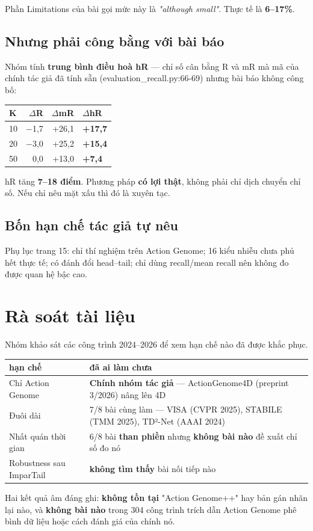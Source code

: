 \documentclass[11pt,a4paper]{article}
\newcommand{\code}[1]{{\ttfamily\small\color{codetext}#1}}
\begin{document}
Phần Limitations của bài gọi mức này là \emph{"although small"}. Thực tế là \textbf{6--17\%}.

\subsection{Nhưng phải công bằng với bài báo}
Nhóm tính \textbf{trung bình điều hoà hR} --- chỉ số cân bằng R và mR mà mã của chính tác giả đã tính sẵn (\code{evaluation\_recall.py:66-69}) nhưng bài báo không công bố:

\begin{center}\small
\begin{tabular}{@{}lrrl@{}}
\toprule
\textbf{K} & \textbf{$\Delta$R} & \textbf{$\Delta$mR} & \textbf{\textbf{$\Delta$hR}}\\
\midrule
10 & −1,7 & +26,1 & \textbf{+17,7}\\
20 & −3,0 & +25,2 & \textbf{+15,4}\\
50 & 0,0 & +13,0 & \textbf{+7,4}\\
\bottomrule
\end{tabular}
\end{center}
hR tăng \textbf{7--18 điểm}. Phương pháp \textbf{có lợi thật}, không phải chỉ dịch chuyển chỉ số. Nếu chỉ nêu mặt xấu thì đó là xuyên tạc.

\subsection{Bốn hạn chế tác giả tự nêu}
Phụ lục trang 15: chỉ thí nghiệm trên Action Genome; 16 kiểu nhiễu chưa phủ hết thực tế; có đánh đổi head--tail; chỉ dùng recall/mean recall nên không đo được quan hệ bậc cao.

\section{Rà soát tài liệu}
Nhóm khảo sát các công trình 2024--2026 để xem hạn chế nào đã được khắc phục.

\begin{center}\small
\begin{tabular}{@{}ll@{}}
\toprule
\textbf{hạn chế} & \textbf{đã ai làm chưa}\\
\midrule
Chỉ Action Genome & \textbf{Chính nhóm tác giả} --- ActionGenome4D (preprint 3/2026) nâng lên 4D\\
Đuôi dài & 7/8 bài cùng làm --- VISA (CVPR 2025), STABILE (TMM 2025), TD²-Net (AAAI 2024)\\
Nhất quán thời gian & 6/8 bài \textbf{than phiền} nhưng \textbf{không bài nào} đề xuất chỉ số đo nó\\
Robustness sau ImparTail & \textbf{không tìm thấy} bài nối tiếp nào\\
\bottomrule
\end{tabular}
\end{center}
Hai kết quả âm đáng ghi: \textbf{không tồn tại} "Action Genome++" hay bản gán nhãn lại nào, và \textbf{không bài nào} trong 304 công trình trích dẫn Action Genome phê bình dữ liệu hoặc cách đánh giá của chính nó.
\end{document}
